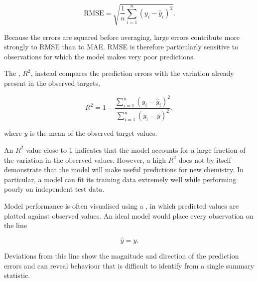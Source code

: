 \begin{equation}
  \mathrm{RMSE} = \sqrt{\frac{1}{n} \sum_{i=1}^{n} \left( y_i - \hat{y}_i \right)^2}.
\end{equation}

Because the errors are squared before averaging, large errors contribute more strongly to RMSE than to MAE.
RMSE is therefore particularly sensitive to observations for which the model makes very poor predictions.

The , \(R^2\), instead compares the prediction errors with the variation already present in the observed targets,

\begin{equation}
  R^2
  = 1
    - \frac{\displaystyle \sum_{i=1}^{n} \left( y_i - \hat{y}_i \right)^2}{\displaystyle \sum_{i=1}^{n} \left( y_i - \bar{y} \right)^2},
\end{equation}

where \(\bar{y}\) is the mean of the observed target values.

An \(R^2\) value close to \(1\) indicates that the model accounts for a large fraction of the variation in the observed values.
However, a high \(R^2\) does not by itself demonstrate that the model will make useful predictions for new chemistry.
In particular, a model can fit its training data extremely well while performing poorly on independent test data.

Model performance is often visualised using a , in which predicted values are plotted against observed values.
An ideal model would place every observation on the line

\begin{equation}
  \hat{y} = y.
\end{equation}

Deviations from this line show the magnitude and direction of the prediction errors and can reveal behaviour that is difficult to identify from a single summary statistic.

